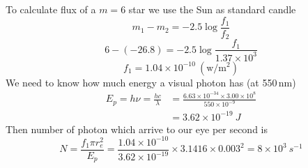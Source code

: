 To calculate flux of a $m = 6$ star we use the Sun as standard candle
\[
m_1 - m_2 = -2.5 \log\frac{f_1}{f_2} \tag*{(1 point)}
\]
\[
6 - (-26.8) = -2.5 \log\frac{f_1}{1.37 \times 10^{3}}
\]
\[
f_1 = 1.04 \times 10^{-10}~(\mathrm{w/m^2}) \tag*{(3 points)}
\]
We need to know how much energy a visual photon has (at 550\,nm)
\begin{align*}
E_p = h\nu = \frac{hc}{\lambda}
&= \frac{6.63 \times 10^{-34} \times 3.00 \times 10^{8}}{550 \times 10^{-9}}\\
&= 3.62 \times 10^{-19}~J \tag*{(3 points)}
\end{align*}
Then number of photon which arrive to our eye per second is
\[
N = \frac{f_1 \pi r_e^2}{E_p}
  = \frac{1.04 \times 10^{-10}}{3.62 \times 10^{-19}} \times 3.1416 \times 0.003^2
  = 8 \times 10^{3}~s^{-1} \tag*{(3 points)}
\]
